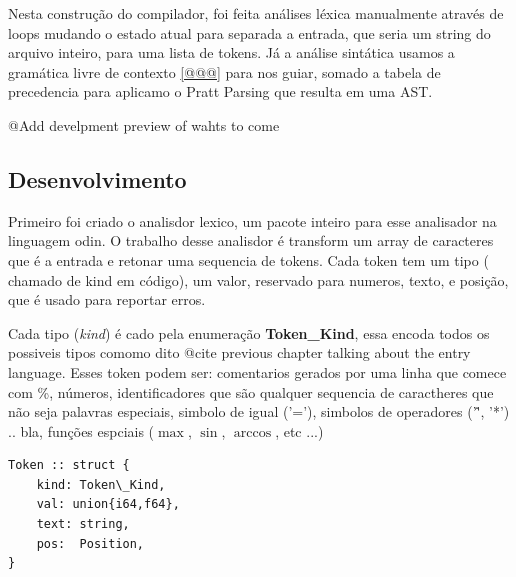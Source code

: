 Nesta construção do compilador, foi feita análises léxica manualmente através de loops mudando o estado atual para separada a entrada, que seria um string do arquivo inteiro, para uma lista de tokens. Já a análise sintática usamos a gramática livre de contexto \autoref{@@@} para nos guiar, somado a tabela de precedencia para aplicamo o Pratt Parsing que resulta em uma AST.

%
%

@{Add develpment preview of wahts to come}
\subsection{Desenvolvimento}

Primeiro foi criado o analisdor lexico, um pacote inteiro para esse analisador na linguagem odin.
O trabalho desse analisdor é transform um array de caracteres que é a entrada e retonar uma sequencia de tokens.
Cada token tem um tipo ( chamado de kind em código), um valor, reservado para numeros, texto, e posição, que é usado para reportar erros.

Cada tipo (\textit{kind}) é cado pela enumeração \textbf{Token\_Kind}, essa encoda todos os possiveis tipos comomo dito @{cite previous chapter talking about the entry language}.
Esses token podem ser: comentarios gerados por uma linha que comece com \%, números, identificadores que são qualquer sequencia de caractheres que não seja palavras especiais, simbolo de igual ('='), simbolos de operadores ('\^', '*') .. bla, funções espciais ($\max$, $\sin$, $\arccos$, etc ...)


\begin{codigo}[H]
  \caption{\small } \label{}
\begin{lstlisting}
Token :: struct {
    kind: Token\_Kind,
    val: union{i64,f64},
    text: string,
    pos:  Position,
}

\end{lstlisting}
\end{codigo}

